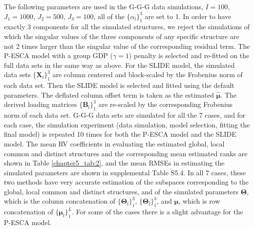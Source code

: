 The following parameters are used in the G-G-G data simulations, $I = 100$, $J_1 = 1000$, $J_2 = 500$, $J_3 = 100$, all of the $\{ \alpha_l \}_1^3$ are set to 1. In order to have exactly 3 components for all the simulated structures, we reject the simulations of which the singular values of the three components of any specific structure are not 2 times larger than the singular value of the corresponding residual term. The P-ESCA model with a group GDP ($\gamma=1$) penalty is selected and re-fitted on the full data sets in the same way as above. For the SLIDE model, the simulated data sets $\{ \mathbf{X}_l \}_1^{3} $ are column centered and block-scaled by the Frobenius norm of each data set. Then the SLIDE model is selected and fitted using the default parameters. The deflated column offset term is taken as the estimated $\hat{\bm{\mu}}$. The derived loading matrices $\{ \mathbf{B}_l \}_1^3$ are re-scaled by the corresponding Frobenius norm of each data set. G-G-G data sets are simulated for all the 7 cases, and for each case, the simulation experiment (data simulation, model selection, fitting the final model) is repeated 10 times for both the P-ESCA model and the SLIDE model. The mean RV coefficients in evaluating the estimated global, local common and distinct structures and the corresponding mean estimated ranks are shown in Table \ref{chapter5_tab:2}, and the mean RMSEs in estimating the simulated parameters are shown in supplemental Table S5.4. In all 7 cases, these two methods have very accurate estimation of the subspaces corresponding to the global, local common and distinct structures, and of the simulated parameters $\mathbf{\Theta}$, which is the column concatenation of $\{ \mathbf{\Theta}_l \}_1^{3} $, $\{ \mathbf{\Theta}_l \}_1^{3} $, and $\bm{\mu}$, which is row concatenation of $\{ \bm{\mu}_l \}_1^L$. For some of the cases there is a slight advantage for the P-ESCA model.

